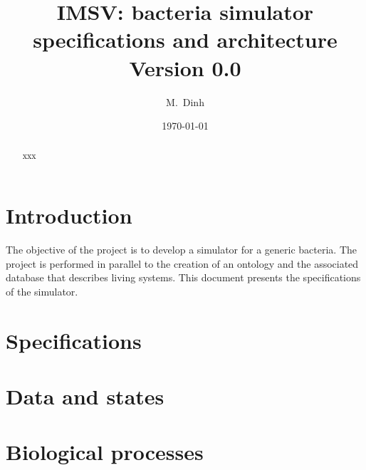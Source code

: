 \documentclass[12pt]{article}
\theoremstyle{definition}
\theoremstyle{remark}
\numberwithin{equation}{section}
\begin{document}
\normalem

\title{{IMSV}: bacteria simulator specifications and architecture \\ Version 0.0}%
\author{M.~Dinh}%
\date{\today}%
\maketitle
\begin{abstract}
  xxx %
\end{abstract}
\section{Introduction}

The objective of the project is to develop a simulator for a generic bacteria. The project is performed in parallel to the creation of an ontology and the associated database that describes living systems. This document presents the specifications of the simulator.



\section{Specifications}


\section{Data and states}


\section{Biological processes}





\printindex
\end{document}
